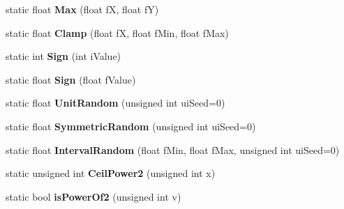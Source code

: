 \begin{DoxyCompactItemize}
\item 
static float {\bfseries Max} (float fX, float fY)\hypertarget{class_i_dream_sky_1_1_math_a681e5060e5b4c051829fbff70be5538d}{}\label{class_i_dream_sky_1_1_math_a681e5060e5b4c051829fbff70be5538d}

\item 
static float {\bfseries Clamp} (float fX, float f\+Min, float f\+Max)\hypertarget{class_i_dream_sky_1_1_math_a9f23512eee34b43497f4bbc8c4c9461e}{}\label{class_i_dream_sky_1_1_math_a9f23512eee34b43497f4bbc8c4c9461e}

\item 
static int {\bfseries Sign} (int i\+Value)\hypertarget{class_i_dream_sky_1_1_math_a9f79a598459a64f2d554f97a001c64b9}{}\label{class_i_dream_sky_1_1_math_a9f79a598459a64f2d554f97a001c64b9}

\item 
static float {\bfseries Sign} (float f\+Value)\hypertarget{class_i_dream_sky_1_1_math_acbc6791ccf58973ca745362514f62cc0}{}\label{class_i_dream_sky_1_1_math_acbc6791ccf58973ca745362514f62cc0}

\item 
static float {\bfseries Unit\+Random} (unsigned int ui\+Seed=0)\hypertarget{class_i_dream_sky_1_1_math_af3532885e292fb4a3540df0a6f914223}{}\label{class_i_dream_sky_1_1_math_af3532885e292fb4a3540df0a6f914223}

\item 
static float {\bfseries Symmetric\+Random} (unsigned int ui\+Seed=0)\hypertarget{class_i_dream_sky_1_1_math_a632172c32054a3ec4ff512535035be78}{}\label{class_i_dream_sky_1_1_math_a632172c32054a3ec4ff512535035be78}

\item 
static float {\bfseries Interval\+Random} (float f\+Min, float f\+Max, unsigned int ui\+Seed=0)\hypertarget{class_i_dream_sky_1_1_math_a623035316859e6d3512b9f8d36c5c080}{}\label{class_i_dream_sky_1_1_math_a623035316859e6d3512b9f8d36c5c080}

\item 
static unsigned int {\bfseries Ceil\+Power2} (unsigned int x)\hypertarget{class_i_dream_sky_1_1_math_a50e4c769c7d438c774572aa5890be41e}{}\label{class_i_dream_sky_1_1_math_a50e4c769c7d438c774572aa5890be41e}

\item 
static bool {\bfseries is\+Power\+Of2} (unsigned int v)\hypertarget{class_i_dream_sky_1_1_math_a72aeb693e4adb2dd466802812813028c}{}\label{class_i_dream_sky_1_1_math_a72aeb693e4adb2dd466802812813028c}


\end{DoxyCompactItemize}
